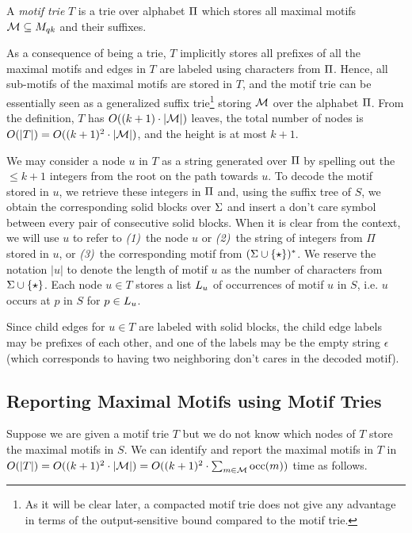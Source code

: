 \begin{definition}
A \emph{motif trie} $T$ is a trie over alphabet $\Pi$ which stores all maximal motifs $\mathcal{M} \subseteq M_{qk}$ and their suffixes.
\end{definition}

As a consequence of being a trie, $T$ implicitly stores all prefixes of all the maximal motifs and edges in $T$ are labeled using characters from $\Pi$.
Hence, all sub-motifs of the maximal motifs are stored in $T$, and the motif trie can be essentially seen as a generalized suffix trie\footnote{As it will be clear later, a compacted motif trie does not give any advantage in terms of the output-sensitive bound compared to the motif trie.} storing $\mathcal{M}$ over the alphabet $\Pi$. From the definition, $T$ has 
$O((k+1) \cdot |\mathcal{M}|)$ leaves, the total number of nodes is $O(|T|) = O((k+1)^2 \cdot |\mathcal{M}|)$, and the height is at most $k+1$. 

We may consider a node $u$ in $T$ as a string generated over $\Pi$ by spelling out the $\leq k+1$ integers from the root on the path towards $u$. To decode the motif stored in $u$, we retrieve these integers in $\Pi$ and, using the suffix tree of $S$, we obtain the corresponding solid blocks over $\Sigma$ and insert a don't care symbol between every pair of consecutive solid blocks. When it is clear from the context, we will use $u$ to refer to \emph{(1)}~the node $u$ or \emph{(2)}~the string of integers from $\Pi$ stored in $u$, or \emph{(3)}~the corresponding motif from $(\Sigma \cup \{ \star \})^*$. We reserve the notation $|u|$ to denote the length of motif $u$ as the number of characters from $\Sigma \cup \{ \star \}$. Each node $u \in T$ stores a list $L_{u}$ of occurrences of motif $u$ in $S$, i.e. $u$ occurs at $p$ in $S$ for $p \in L_{u}$.

Since child edges for $u \in T$ are labeled with solid blocks, the child edge labels may be prefixes of each other, and one of the labels may be the empty string $\epsilon$ (which corresponds to having two neighboring don't cares in the decoded motif).


\subsection{Reporting Maximal Motifs using Motif Tries}
\label{subec:reporting-maximal-motifs}
%
Suppose we are given a motif trie $T$ but we do not know which nodes of $T$ store the maximal motifs in $S$. We can identify and report the maximal motifs in $T$ in $O(|T|) = O((k+1)^2 \cdot |\mathcal{M}|) = O((k+1)^2 \cdot \sum_{m \in \mathcal{M}} \operatorname{occ}(m))$ time as follows.

